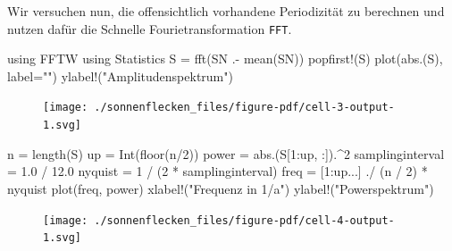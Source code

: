 \documentclass[
  a4paper,
  DIV=11]{scrreprt}
\newenvironment{Shaded}{\begin{snugshade}}{\end{snugshade}}
\newcommand{\BuiltInTok}[1]{\textcolor[rgb]{0.00,0.23,0.31}{#1}}
\newcommand{\FloatTok}[1]{\textcolor[rgb]{0.68,0.00,0.00}{#1}}
\newcommand{\FunctionTok}[1]{\textcolor[rgb]{0.28,0.35,0.67}{#1}}
\newcommand{\ImportTok}[1]{\textcolor[rgb]{0.00,0.46,0.62}{#1}}
\newcommand{\NormalTok}[1]{\textcolor[rgb]{0.00,0.23,0.31}{#1}}
\newcommand{\OperatorTok}[1]{\textcolor[rgb]{0.37,0.37,0.37}{#1}}
\newcommand{\StringTok}[1]{\textcolor[rgb]{0.13,0.47,0.30}{#1}}
\begin{document}
Wir versuchen nun, die offensichtlich vorhandene Periodizität zu
berechnen und nutzen dafür die Schnelle Fourietransformation
\texttt{FFT}.

\begin{Shaded}
\begin{Highlighting}[]
\ImportTok{using} \BuiltInTok{FFTW}
\ImportTok{using} \BuiltInTok{Statistics}
\NormalTok{S }\OperatorTok{=} \FunctionTok{fft}\NormalTok{(SN }\OperatorTok{.{-}} \FunctionTok{mean}\NormalTok{(SN))}
\FunctionTok{popfirst!}\NormalTok{(S)}
\FunctionTok{plot}\NormalTok{(}\FunctionTok{abs}\NormalTok{.(S), label}\OperatorTok{=}\StringTok{""}\NormalTok{)}
\FunctionTok{ylabel!}\NormalTok{(}\StringTok{"Amplitudenspektrum"}\NormalTok{)}
\end{Highlighting}
\end{Shaded}

\begin{figure}[H]

{\centering \texttt{[image: ./sonnenflecken\_files/figure-pdf/cell-3-output-1.svg]}

}

\end{figure}

\begin{Shaded}
\begin{Highlighting}[]
\NormalTok{n }\OperatorTok{=} \FunctionTok{length}\NormalTok{(S)}
\NormalTok{up }\OperatorTok{=} \FunctionTok{Int}\NormalTok{(}\FunctionTok{floor}\NormalTok{(n}\OperatorTok{/}\FloatTok{2}\NormalTok{))}
\NormalTok{power }\OperatorTok{=} \FunctionTok{abs}\NormalTok{.(S[}\FloatTok{1}\OperatorTok{:}\NormalTok{up, }\OperatorTok{:}\NormalTok{])}\OperatorTok{.\^{}}\FloatTok{2}
\NormalTok{samplinginterval }\OperatorTok{=} \FloatTok{1.0} \OperatorTok{/} \FloatTok{12.0}
\NormalTok{nyquist }\OperatorTok{=} \FloatTok{1} \OperatorTok{/}\NormalTok{ (}\FloatTok{2} \OperatorTok{*}\NormalTok{ samplinginterval)}
\NormalTok{freq }\OperatorTok{=}\NormalTok{ [}\FloatTok{1}\OperatorTok{:}\NormalTok{up}\OperatorTok{...}\NormalTok{] }\OperatorTok{./}\NormalTok{ (n }\OperatorTok{/} \FloatTok{2}\NormalTok{) }\OperatorTok{*}\NormalTok{ nyquist}
\FunctionTok{plot}\NormalTok{(freq, power)}
\FunctionTok{xlabel!}\NormalTok{(}\StringTok{"Frequenz in 1/a"}\NormalTok{)}
\FunctionTok{ylabel!}\NormalTok{(}\StringTok{"Powerspektrum"}\NormalTok{)}
\end{Highlighting}
\end{Shaded}

\begin{figure}[H]

{\centering \texttt{[image: ./sonnenflecken\_files/figure-pdf/cell-4-output-1.svg]}

}

\end{figure}
\end{document}
